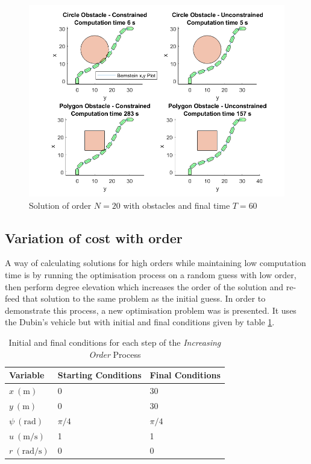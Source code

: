 \begin{figure}[h!]
\centering
\includegraphics[width=\textwidth]{Images/results/ostaclesfigures.png}
\caption{Solution of order $N=20$ with obstacles and final time $T=60$}
\label{fig:obstaclesfigures}
\end{figure}


\subsection{Variation of cost with order}

\par A way of calculating solutions for high orders while maintaining low computation time is by running the optimisation process on a random guess with low order, then perform degree elevation which increases the order of the solution and re-feed that solution to the same problem as the initial guess. In order to demonstrate this process, a new optimisation problem was is presented. It uses the Dubin's vehicle but with initial and final conditions given by table \ref{tab:increasingNproblem}. 

\begin{table}[h!]
\centering
\begin{tabular}{|l|l|l|}
\hline
Variable & Starting Conditions & Final Conditions \\ \hline
$x\ (\si{\meter})$ & 0 & 30 \\
$y\ (\si{\meter})$ & 0 & 30 \\
$\psi\ (\si{\radian})$ & $\pi/4$ & $\pi/4$ \\
$u\ (\si{\meter\per\second})$ & 1 & 1 \\
$r\ (\si{\radian\per\second})$ & 0 & 0 \\
\hline
\end{tabular}
\caption{Initial and final conditions for each step of the \textit{Increasing Order} Process}
\label{tab:increasingNproblem}
\end{table}


